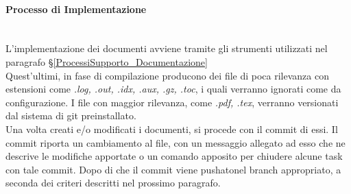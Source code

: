 
\paragraph{Processo di Implementazione} \-\\
L'implementazione dei documenti avviene tramite gli strumenti utilizzati nel paragrafo §\ref{ProcessiSupporto_Documentazione}\\
Quest'ultimi, in fase di compilazione producono dei file di poca rilevanza con estensioni come \textit{.log, .out, .idx, .aux, .gz, .toc}, i quali verranno ignorati come da configurazione. I file con maggior rilevanza, come \textit{.pdf, .tex}, verranno versionati dal sistema di git preinstallato. \\
Una volta creati e/o modificati i documenti, si procede con il commit di essi. Il commit riporta un cambiamento al file, con un messaggio allegato ad esso che ne 
descrive le modifiche apportate o un comando apposito per chiudere alcune task con tale commit. Dopo di che il commit viene pushato\glossario nel branch appropriato, a seconda dei criteri descritti nel prossimo paragrafo. 


